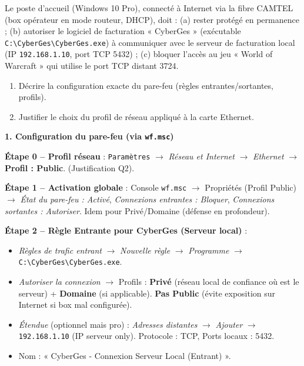 \documentclass[11pt]{article}
\begin{document}
\begin{exoresolu}
Le poste d'accueil (Windows 10 Pro), connecté à Internet via la fibre CAMTEL (box opérateur en mode routeur, DHCP), doit : (a) rester protégé en permanence ; (b) autoriser le logiciel de facturation « CyberGes » (exécutable \texttt{C:\textbackslash CyberGes\textbackslash CyberGes.exe}) à communiquer avec le serveur de facturation local (IP \texttt{192.168.1.10}, port TCP 5432) ; (c) bloquer l'accès au jeu « World of Warcraft » qui utilise le port TCP distant 3724.
\begin{enumerate}
\item Décrire la configuration exacte du pare-feu (règles entrantes/sortantes, profils).
\item Justifier le choix du profil de réseau appliqué à la carte Ethernet.
\end{enumerate}
\tcblower
\textbf{1. Configuration du pare-feu (via \texttt{wf.msc})}

\textbf{Étape 0 -- Profil réseau} : \texttt{Paramètres} $\rightarrow$ \emph{Réseau et Internet} $\rightarrow$ \emph{Ethernet} $\rightarrow$ \textbf{Profil : Public}. (Justification Q2).

\textbf{Étape 1 -- Activation globale} : Console \texttt{wf.msc} $\rightarrow$ Propriétés (Profil Public) $\rightarrow$ \emph{État du pare-feu : Activé}, \emph{Connexions entrantes : Bloquer}, \emph{Connexions sortantes : Autoriser}. Idem pour Privé/Domaine (défense en profondeur).

\textbf{Étape 2 -- Règle Entrante pour CyberGes (Serveur local)} :
\begin{itemize}
\item \emph{Règles de trafic entrant} $\rightarrow$ \emph{Nouvelle règle} $\rightarrow$ \emph{Programme} $\rightarrow$ \texttt{C:\textbackslash CyberGes\textbackslash CyberGes.exe}.
\item \emph{Autoriser la connexion} $\rightarrow$ Profils : \textbf{Privé} (réseau local de confiance où est le serveur) + \textbf{Domaine} (si applicable). \textbf{Pas Public} (évite exposition sur Internet si box mal configurée).
\item \emph{Étendue} (optionnel mais pro) : \emph{Adresses distantes} $\rightarrow$ \emph{Ajouter} $\rightarrow$ \texttt{192.168.1.10} (IP serveur only). Protocole : TCP, Ports locaux : 5432.
\item Nom : « CyberGes - Connexion Serveur Local (Entrant) ».
\end{itemize}


\end{exoresolu}
\end{document}
